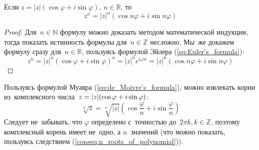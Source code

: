 \begin{theorem}
\label{eq:de_Moivre's_formula}
Если $z = |z|(\cos \varphi + i\sin \varphi)$, $n \in \mathbb R$, то
\begin{equation*}
z^n = |z|^n(\cos n\varphi + i\sin n\varphi)
\end{equation*}
\end{theorem}
\begin{proof}
Для~$n \in \mathbb N$ формулу можно доказать методом математической индукции, тогда показать истинность формулы для~$n \in \mathbb Z$ несложно.
Мы~же докажем формулу сразу для~$n \in \mathbb R$, пользуясь формулой Эйлера (\ref{eq:Euler's_formula}):
\begin{equation*}
z^n = |z|^n(\cos \varphi + i\sin \varphi)^n =
|z|^n e^{i\varphi n} = |z|^n (\cos n\varphi + i\sin n\varphi)
\end{equation*}
\end{proof}

Пользуясь формулой Муавра (\ref{eq:de_Moivre's_formula}), можно извлекать корни из~комплексного числа~$z = |z|(\cos \varphi \opbr+ i\sin \varphi)$:
\begin{equation*}
\sqrt[n]{z} = \sqrt[n]{|z|}(\cos \frac{\varphi}n + i\sin \frac{\varphi}n)
\end{equation*}
Следует не~забывать, что $\varphi$ определено с~точностью до~$2\pi k, k \in \mathbb Z$, поэтому комплексный корень имеет не~одно, а $n$~значений (что можно показать, пользуясь следствием (\ref{conseq:n_roots_of_polynomial})).